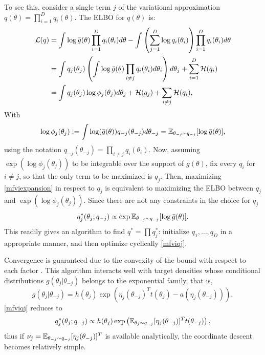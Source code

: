 To see this, consider a single term $j$ of the variational approximation $q(\theta) = \prod_{i=1}^D q_i(\theta)$. The ELBO for $q(\theta)$ is:
\begin{equation} \label{mfviexpansion}
\begin{split}
\mathcal{L}(q) & = \int \log {\bar{g}}(\theta) \prod_{i=1}^D q_i(\theta_i) d \theta - \int \left(\sum_{j=1}^D \log q_i(\theta_i) \right) \prod_{i=1}^D q_i(\theta_i) d \theta \\
	     & = \int q_j(\theta_j) \left( \int \log {\bar{g}}(\theta) \prod_{i \neq j} q_i(\theta_i) d \theta_i \right) d\theta_j + \sum_{i=1}^D \mathcal{H}(q_i) \\
	     & = \int q_j(\theta_j) \log \phi_j (\theta_j) d\theta_j + \mathcal{H}(q_j) + \sum_{i\neq j} \mathcal{H}(q_i),
\end{split}
\end{equation}
With
\begin{displaymath}
\log \phi_j(\theta_j) := \int \log({\bar{g}}(\theta)) q_{-j}(\theta_{-j}) d\theta_{-j} = {\mathbb E}_{\theta_{-j} \sim q_{-j}} [ \log {\bar{g}}(\theta) ],
\end{displaymath}
using the notation $q_{-j}(\theta_{-j}) = \prod_{i\neq j}q_i(\theta_i)$.
Now, assuming $\exp ( \log \phi_j(\theta_j))$ to be integrable over the support of $g(\theta)$, fix every $q_i$ for $i \neq j$, so that the only term to be maximized is $q_j$. Then, maximizing \eqref{mfviexpansion} in respect to $q_j$ is equivalent to maximizing the ELBO between $q_j$ and $\exp \left(\log \phi_j(\theta_j)\right) $. Since there are not any constraints in the choice for $q_j$
\begin{equation} \label{mfviqj}
q^{*}_j(\theta_j;q_{-j}) \propto \exp {\mathbb E}_{\theta_{-j} \sim q_{-j}} [ \log {\bar{g}}(\theta)].
\end{equation}
This readily gives an algorithm to find $q^* = \prod q^*_j$: initialize $q_1,\ldots,q_D$ in a appropriate manner, and then optimize cyclically \eqref{mfviqj}. 

Convergence is guaranteed due to the convexity of the bound with respect to each factor \cite{Bishop_2007,Boyd_2004}. This algorithm interacts well with target densities whose conditional distributions $g(\theta_j|\theta_{-j})$ belongs to the exponential family, that is, 
\begin{equation}\label{exponential_family}
 g(\theta_j|\theta_{-j}) = h(\theta_j) \exp \left( \eta_j(\theta_{-j})^T t(\theta_j) - a(\eta_j(\theta_{-j})) \right),
\end{equation}
\eqref{mfviqj} reduces to \cite{Blei_2017} 
\begin{equation}
 q^*_j(\theta_j;q_{-j}) \propto h(\theta_j) \exp \left( {\mathbb E}_{\theta_j \sim q_{-j}} [\eta_j(\theta_{-j})]^T t(\theta_{-j}) \right),
\end{equation}
thus if $\nu_j = {\mathbb E}_{\theta_{-j} \sim q_{-j}}[\eta_j(\theta_{-j})]^T$ is available analytically, the coordinate descent becomes relatively simple.

